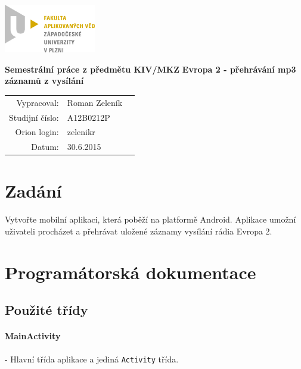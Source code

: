 \documentclass[12pt,a4paper,titlepage]{article}
\begin{document}
\includegraphics[width = 4cm]{LOGO.png} 
\\[8\baselineskip]
\begin{center}

\LARGE\textbf{Semestrální práce z předmětu KIV/MKZ}\linebreak\linebreak
\Large\textbf{Evropa 2 - přehrávání mp3 záznamů z vysílání}\\[11\baselineskip]
\end{center}

\begin{center}
\begin{tabular}{rll}
Vypracoval: & Roman Zeleník \\ 
Studijní číslo: & A12B0212P \\ 
Orion login: & zelenikr \\ 
Datum: & \multicolumn{2}{l}{30.6.2015} \\ 
\end{tabular} 
\end{center}
\thispagestyle{empty}
\pagebreak 

\renewcommand{\cftsecleader}{\cftdotfill{\cftdotsep}}
\tableofcontents
\thispagestyle{empty}
\pagebreak
\setcounter{page}{1}
\section{Zadání}
	\paragraph{}
	Vytvořte mobilní aplikaci, která poběží na platformě Android. Aplikace umožní uživateli procházet a přehrávat uložené záznamy vysílání rádia Evropa 2.

\section{Programátorská dokumentace}
	\subsection{Použité třídy}
	\paragraph{MainActivity}
	- Hlavní třída aplikace a jediná \texttt{Activity} třída. 
	
\end{document}

